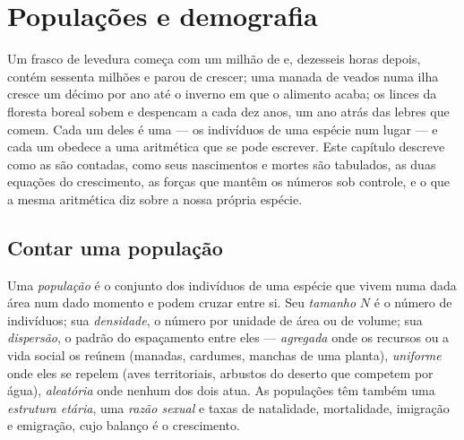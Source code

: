 \chapter{Populações e demografia}\label{ch:b1:populations}

Um frasco de levedura começa com um milhão de  e, dezesseis
horas depois, contém sessenta milhões e parou de crescer; uma manada
de veados numa ilha cresce um décimo por ano até o inverno em que o
alimento acaba; os linces da floresta boreal sobem e despencam a cada
dez anos, um ano atrás das lebres que comem. Cada um deles é uma
\emph{} --- os indivíduos de uma espécie num lugar --- e cada
um obedece a uma aritmética que se pode escrever. Este capítulo
descreve como as  são contadas, como seus nascimentos e
mortes são tabulados, as duas equações do crescimento, as forças que
mantêm os números sob controle, e o que a mesma aritmética diz sobre a
nossa própria espécie.

\section{Contar uma população}

\begin{definition}\label{def:b1:populations:population}
Uma \emph{população} é o conjunto dos indivíduos de uma espécie que
vivem numa dada área num dado momento e podem cruzar entre si. Seu
\emph{tamanho} $N$ é o número de indivíduos; sua \emph{densidade}, o
número por unidade de área ou de volume; sua \emph{dispersão}, o padrão
do espaçamento entre eles --- \emph{agregada} onde os recursos ou a
vida social os reúnem (manadas, cardumes, manchas de uma planta),
\emph{uniforme} onde eles se repelem (aves territoriais, arbustos do
deserto que competem por água), \emph{aleatória} onde nenhum dos dois
atua. As populações têm também uma \emph{estrutura etária}, uma
\emph{razão sexual} e taxas de natalidade, mortalidade, imigração e
emigração, cujo balanço é o crescimento.
\end{definition}

